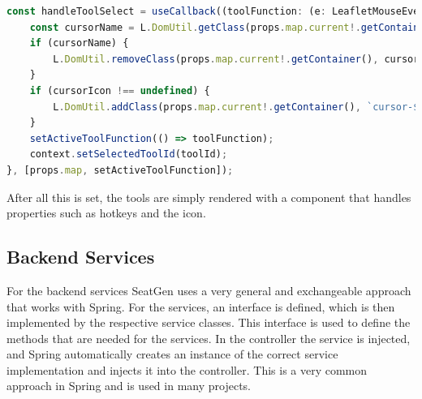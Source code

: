 \begin{lstlisting}[language=TypeScript,caption={Handle tool select function},label={lst:handle-tool-select}]
const handleToolSelect = useCallback((toolFunction: (e: LeafletMouseEvent) => void, toolId: string, cursorIcon?: string) => {
    const cursorName = L.DomUtil.getClass(props.map.current!.getContainer()).split(" ").find((it) => it.startsWith("cursor-"));
    if (cursorName) {
        L.DomUtil.removeClass(props.map.current!.getContainer(), cursorName);
    }
    if (cursorIcon !== undefined) {
        L.DomUtil.addClass(props.map.current!.getContainer(), `cursor-${cursorIcon}`);
    }
    setActiveToolFunction(() => toolFunction);
    context.setSelectedToolId(toolId);
}, [props.map, setActiveToolFunction]);
\end{lstlisting}

After all this is set, the tools are simply rendered with a component that handles properties such as hotkeys and the icon.

\subsection{Backend Services}
For the backend services SeatGen uses a very general and exchangeable approach that works with Spring. For the services, an interface is defined, which is then implemented by the respective service classes. This interface is used to define the methods that are needed for the services. In the controller the service is injected, and Spring automatically creates an instance of the correct service implementation and injects it into the controller. This is a very common approach in Spring and is used in many projects.